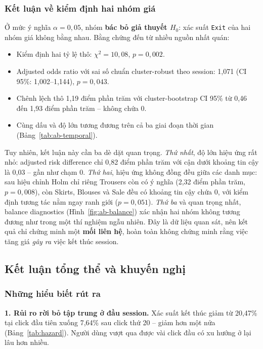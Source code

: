 \subsubsection{Kết luận về kiểm định hai nhóm giá}

Ở mức ý nghĩa $\alpha = 0{,}05$, nhóm \textbf{bác bỏ giả thuyết $H_0$}: xác suất
\texttt{Exit} của hai nhóm giá không bằng nhau. Bằng chứng đến từ nhiều nguồn
nhất quán:

\begin{itemize}
  \item Kiểm định hai tỷ lệ thô: $\chi^2 = 10{,}08$, $p = 0{,}002$.
  \item Adjusted odds ratio với sai số chuẩn cluster-robust theo session:
  1,071 (CI 95\%: 1,002--1,144), $p = 0{,}043$.
  \item Chênh lệch thô 1,19 điểm phần trăm với cluster-bootstrap CI 95\% từ 0,46
  đến 1,93 điểm phần trăm -- không chứa 0.
  \item Cùng dấu và độ lớn tương đương trên cả ba giai đoạn thời gian
  (Bảng~\ref{tab:ab-temporal}).
\end{itemize}

Tuy nhiên, kết luận này cần ba dè dặt quan trọng. \emph{Thứ nhất}, độ lớn hiệu
ứng rất nhỏ: adjusted risk difference chỉ 0,82 điểm phần trăm với cận dưới khoảng
tin cậy là 0,03 -- gần như chạm 0. \emph{Thứ hai}, hiệu ứng không đồng đều giữa
các danh mục: sau hiệu chỉnh Holm chỉ riêng Trousers còn có ý nghĩa (2,32 điểm
phần trăm, $p = 0{,}008$), còn Skirts, Blouses và Sale đều có khoảng tin cậy chứa
0, với kiểm định tương tác nằm ngay ranh giới ($p = 0{,}051$). \emph{Thứ ba} và
quan trọng nhất, balance diagnostics (Hình~\ref{fig:ab-balance}) xác nhận hai
nhóm không tương đương như trong một thí nghiệm ngẫu nhiên. Đây là dữ liệu quan
sát, nên kết quả chỉ chứng minh một \textbf{mối liên hệ}, hoàn toàn không chứng
minh rằng việc tăng giá \emph{gây ra} việc kết thúc session.

\subsection{Kết luận tổng thể và khuyến nghị}

\subsubsection{Những hiểu biết rút ra}

\textbf{1. Rủi ro rời bỏ tập trung ở đầu session.} Xác suất kết thúc giảm từ
20,47\% tại click đầu tiên xuống 7,64\% sau click thứ 20 -- giảm hơn một nửa
(Bảng~\ref{tab:hazard}). Người dùng vượt qua được vài click đầu có xu hướng ở lại
lâu hơn nhiều.

